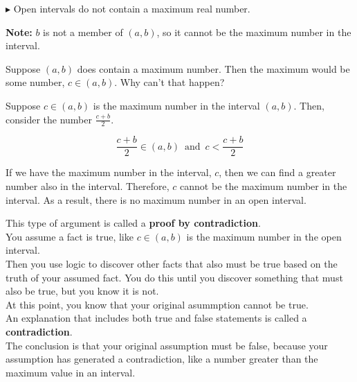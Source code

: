 \documentclass{ximera}
\begin{document}
$\blacktriangleright$ Open intervals do not contain a maximum real number.

\textbf{Note:} $b$ is not a member of $(a,b)$, so it cannot be the maximum number in the interval.   


\begin{explanation}

Suppose $(a,b)$ does contain a maximum number. Then the maximum would be some number, $c \in (a,b)$.  Why can't that happen?  


Suppose $c \in (a,b)$ is the maximum number in the interval $(a,b)$.  Then, consider the number  $\frac{c+b}{2}$.   

\[  \frac{c+b}{2} \in (a,b)  \, \text{ and } \,  c < \frac{c+b}{2} \]  


If we have the maximum number in the interval, $c$, then we can find a greater number also in the interval. Therefore, $c$ cannot be the maximum number in the interval.  As a result, there is no maximum number in an open interval. \\


\end{explanation}






\begin{paradox}

This type of argument is called a \textbf{proof by contradiction}.   \\

You assume a fact is true, like $c \in (a,b)$ is the maximum number in the open interval.  \\

Then you use logic to discover other facts that also must be true based on the truth of your assumed fact.  You do this until you discover something that must also be true, but you know it is not. \\

At this point, you know that your original asummption cannot be true. \\

An explanation that includes both true and false statements is called a \textbf{contradiction}. \\

The conclusion is that your original assumption must be false, because your assumption has generated a contradiction, like a number greater than the maximum value in an interval.


\end{paradox}
\end{document}
